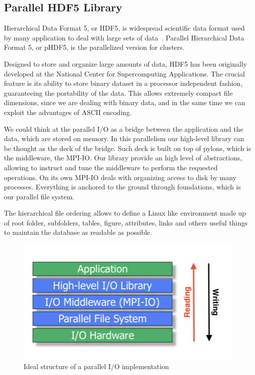 \subsection{Parallel HDF5 Library}
Hierarchical Data Format 5, or HDF5, is widespread scientific data format used by many application to deal with large sets of data~\cite{hdf5}. Parallel Hierarchical Data Format 5, or pHDF5, is the parallelized version for clusters.\par
Designed to store and organize large amounts of data, HDF5 has been originally developed at the National Center for Supercomputing Applications. 
The crucial feature is its ability to store binary dataset in a processor independent fashion, guaranteeing the portability of the data. This allows extremely compact file dimensions, since we are dealing with binary data, and in the same time we can exploit the advantages of ASCII encoding.\par
We could think at the parallel I/O as a bridge between the application and the data, which are stored on memory. In this parallelism our high-level library can be thought as the deck of the bridge. Such deck is built on top of pylons, which is the middleware, the MPI-IO. Our library provide an high level of abstractions, allowing to instruct and tune the middleware to perform the requested operations. On its own MPI-IO deals with organizing access to disk by many processes. Everything is anchored to the ground through foundations, which is our parallel file system.\par
The hierarchical file ordering allows to define a Linux like environment made up of root folder, subfolders, tables, figure, attributes, links and others useful things to maintain the database as readable as possible.\par
\begin{figure}
\begin{center}
\includegraphics[scale=0.4]{grafici/parallelio}
\caption{Ideal structure of a parallel I/O implementation}
\label{default}
\end{center}
\end{figure}

